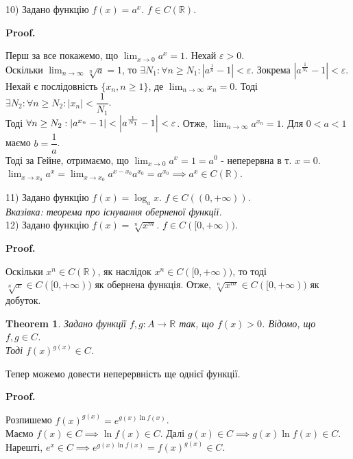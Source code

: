 \documentclass[a4paper, 14pt]{article}
\makeatletter
\def\qed{$\blacksquare$}
\theoremstyle{theoremdd}
\newtheorem{theorem}{Theorem}[subsection]
\theoremstyle{theoremdd}
\theoremstyle{theoremdd}
\theoremstyle{theoremdd}
\theoremstyle{theoremdd}
\theoremstyle{theoremdd}
\theoremstyle{theoremdd}
\theoremstyle{theoremdd}
\renewenvironment{proof}[1][Proof.\\]{\par
\pushQED{\hfill \qed}%
\normalfont \topsep6\p@\@plus6\p@\relax
\trivlist
\item\relax
{\bfseries
#1\@addpunct{.}}\hspace\labelsep\ignorespaces
}{%
\popQED\endtrivlist\@endpefalse
}
\makeatother
\begin{document}
10) Задано функцію $f(x) = a^x$. $f \in C(\mathbb{R})$.
\begin{proof}
Перш за все покажемо, що $\displaystyle\lim_{x \to 0} a^x = 1$. Нехай $\varepsilon > 0$.\\
Оскільки $\displaystyle\lim_{n \to \infty} \sqrt[n]{a} = 1$, то $\exists N_1: \forall n \geq N_1: |a^{\frac{1}{n}} - 1| < \varepsilon$. Зокрема $|a^{\frac{1}{N_1}} - 1| < \varepsilon$.\\
Нехай є послідовність $\{x_n, n \geq 1\}$, де $\displaystyle\lim_{n \to \infty} x_n =0$. Тоді $\exists N_2: \forall n \geq N_2: |x_n| < \dfrac{1}{N_1}$.\\
Тоді $\forall n \geq N_2: |a^{x_n} - 1| < \abs{a^{\frac{1}{N_1}} - 1} < \varepsilon$. Отже, $\displaystyle\lim_{n \to \infty} a^{x_n} = 1$. Для $0 < a < 1$ маємо $b = \dfrac{1}{a}$.\\
Тоді за Гейне, отримаємо, що $\displaystyle\lim_{x \to 0} a^x = 1 = a^0$ - неперервна в т. $x = 0$.
\bigskip \\
$\displaystyle\lim_{x \to x_0} a^x = \lim_{x \to x_0} a^{x-x_0} a^{x_0} = a^{x_0} \implies a^x \in C(\mathbb{R})$.
\end{proof}

11) Задано функцію $f(x) = \log_a x$. $f \in C((0,+\infty))$.\\
\textit{Вказівка: теорема про існування оберненої функції.}
\bigskip \\

12) Задано функцію $f(x) = \sqrt[n]{x^m}$. $f \in C([0,+\infty))$.
\begin{proof}
Оскільки $x^n \in C(\mathbb{R})$, як наслідок $x^n \in C([0,+\infty))$, то тоді $\sqrt[n]{x} \in C([0,+\infty))$ як обернена функція. Отже, $\sqrt[n]{x^m} \in C([0,+\infty))$ як добуток.
\end{proof}

	
	\begin{theorem}
	Задано функції $f,g: A \to \mathbb{R}$ так, що $f(x) > 0$. Відомо, що $f,g \in C$. \\
	Тоді $f(x)^{g(x)} \in C$.
	\end{theorem}
	
	Тепер можемо довести неперервність ще однієї функції.
	\begin{proof}
	Розпишемо $f(x)^{g(x)} = e^{g(x) \ln f(x)}$.\\
	Маємо $f(x) \in C \implies \ln f(x) \in C$. Далі $g(x) \in C \implies g(x) \ln f(x) \in C$. Нарешті, $e^x \in C \implies e^{g(x) \ln f(x)} = f(x)^{g(x)} \in C$.
	\end{proof}
\end{document}
